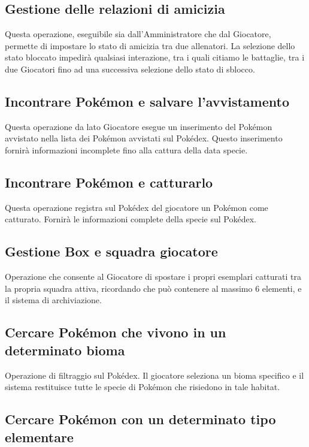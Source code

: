\documentclass[a4paper,12pt]{report}
\begin{document}
\subsection{Gestione delle relazioni di amicizia}

Questa operazione, eseguibile sia dall'Amministratore che dal Giocatore, permette di impostare lo stato di amicizia tra due allenatori. La selezione dello stato bloccato impedirà qualsiasi interazione, tra i quali citiamo le battaglie, tra i due Giocatori fino ad una successiva selezione dello stato di sblocco.

\subsection{Incontrare Pokémon e salvare l'avvistamento}

Questa operazione da lato Giocatore esegue un inserimento del Pokémon avvistato nella lista dei Pokémon avvistati sul Pokédex. Questo inserimento fornirà informazioni incomplete fino alla cattura della data specie.

\subsection{Incontrare Pokémon e catturarlo}

Questa operazione registra sul Pokédex del giocatore un Pokémon come catturato. Fornirà le informazioni complete della specie sul Pokédex.

\subsection{Gestione Box e squadra giocatore}

Operazione che consente al Giocatore di spostare i propri esemplari catturati tra la propria squadra attiva, ricordando che può contenere al massimo 6 elementi, e il sistema di archiviazione.

\subsection{Cercare Pokémon che vivono in un determinato bioma}

Operazione di filtraggio sul Pokédex. Il giocatore seleziona un bioma specifico e il sistema restituisce tutte le specie di Pokémon che risiedono in tale habitat.

\subsection{Cercare Pokémon con un determinato tipo elementare}
\end{document}
